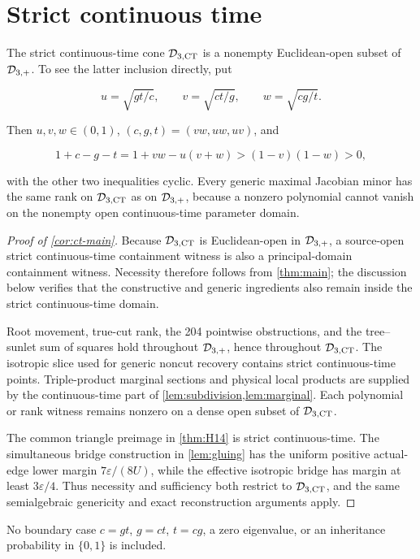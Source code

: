 \section{Strict continuous time}\label{sec:continuous-time}

The strict continuous-time cone \(\mathcal D_{3,\mathrm{CT}}\) is a nonempty Euclidean-open subset
of \(\mathcal D_{3,+}\).  To see the latter inclusion directly, put

\[
 u=\sqrt{gt/c},\qquad v=\sqrt{ct/g},\qquad w=\sqrt{cg/t}.
\]

Then \(u,v,w\in(0,1)\), \((c,g,t)=(vw,uw,uv)\), and

\[
 1+c-g-t=1+vw-u(v+w)>(1-v)(1-w)>0,
\]

with the other two inequalities cyclic.  Every generic maximal Jacobian minor
has the same rank on \(\mathcal D_{3,\mathrm{CT}}\) as on \(\mathcal D_{3,+}\), because a nonzero polynomial
cannot vanish on the nonempty open continuous-time parameter domain.

\begin{proof}[Proof of \cref{cor:ct-main}]
Because \(\mathcal D_{3,\mathrm{CT}}\) is Euclidean-open in \(\mathcal D_{3,+}\), a source-open strict
continuous-time containment witness is also a principal-domain containment
witness.  Necessity therefore follows from \cref{thm:main}; the discussion
below verifies that the constructive and generic ingredients also remain
inside the strict continuous-time domain.

Root movement, true-cut rank, the 204 pointwise obstructions, and the
tree--sunlet sum of squares hold throughout \(\mathcal D_{3,+}\), hence throughout
\(\mathcal D_{3,\mathrm{CT}}\).  The isotropic slice used for generic noncut recovery contains
strict continuous-time points.  Triple-product marginal sections and
physical local products are supplied by the continuous-time part of
\cref{lem:subdivision,lem:marginal}.  Each polynomial or rank witness remains
nonzero on a dense open subset of \(\mathcal D_{3,\mathrm{CT}}\).

The common triangle preimage in \cref{thm:H14} is strict continuous-time.
The simultaneous bridge construction in \cref{lem:gluing} has the uniform
positive actual-edge lower margin \(7\varepsilon/(8U)\), while the effective
isotropic bridge has margin at least \(3\varepsilon/4\).  Thus necessity and sufficiency both
restrict to \(\mathcal D_{3,\mathrm{CT}}\), and the same semialgebraic genericity and exact
reconstruction arguments apply.
\end{proof}

No boundary case \(c=gt\), \(g=ct\), \(t=cg\), a zero eigenvalue, or an
inheritance probability in \(\{0,1\}\) is included.
